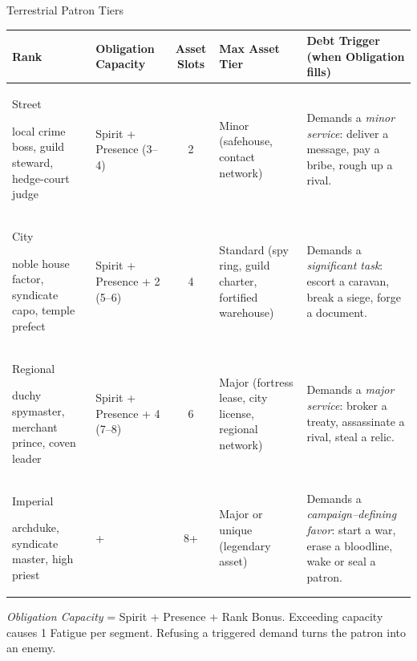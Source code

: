 \begin{gmtable}{Terrestrial Patron Tiers}
\centering
\footnotesize
\setlength{\tabcolsep}{4pt}
\renewcommand{\arraystretch}{1.15}
\begin{tabularx}{\textwidth}{@{}
  >{\raggedright\arraybackslash}p{}
  >{\raggedright\arraybackslash}p{}
  c
  >{\raggedright\arraybackslash}X
  >{\raggedright\arraybackslash}X@{}}
\toprule
\textbf{Rank} & \textbf{Obligation Capacity} & \textbf{Asset Slots} & \textbf{Max Asset Tier} & \textbf{Debt Trigger (when Obligation fills)} \\
\midrule
Street\par\nopagebreak
{\scriptsize local crime boss, guild steward, hedge-court judge}
& Spirit + Presence (3--4) & 2 & Minor (safehouse, contact network)
& Demands a \textit{minor service}: deliver a message, pay a bribe, rough up a rival. \\[4pt]

City\par\nopagebreak
{\scriptsize noble house factor, syndicate capo, temple prefect}
& Spirit + Presence + 2 (5--6) & 4 & Standard (spy ring, guild charter, fortified warehouse)
& Demands a \textit{significant task}: escort a caravan, break a siege, forge a document. \\[4pt]

Regional\par\nopagebreak
{\scriptsize duchy spymaster, merchant prince, coven leader}
& Spirit + Presence + 4 (7--8) & 6 & Major (fortress lease, city license, regional network)
& Demands a \textit{major service}: broker a treaty, assassinate a rival, steal a relic. \\[4pt]

Imperial\par\nopagebreak
{\scriptsize archduke, syndicate master, high priest}
& 8+ & 8+ & Major or unique (legendary asset)
& Demands a \textit{campaign--defining favor}: start a war, erase a bloodline, wake or seal a patron. \\
\bottomrule
\end{tabularx}
\tcblower
\small\textit{Obligation Capacity} = Spirit + Presence + Rank Bonus. Exceeding capacity causes 1 Fatigue per segment. Refusing a triggered demand turns the patron into an enemy.
\end{gmtable}

\vspace{1em}

